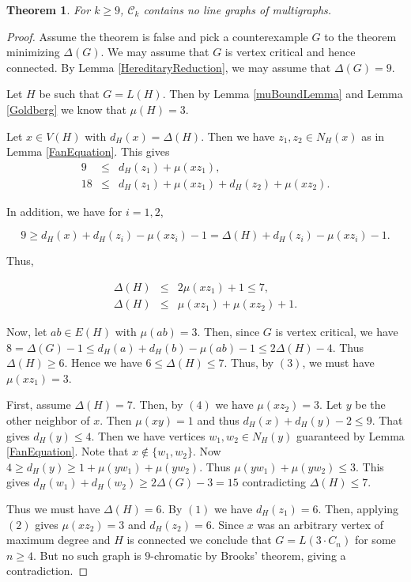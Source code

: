 \documentclass[12pt]{article}
\theoremstyle{plain}
\newtheorem{thm}{Theorem}[section]
\theoremstyle{definition}
\theoremstyle{remark}
\newcommand{\fancy}[1]{\mathcal{#1}}
\newcommand{\C}[1]{\fancy{C}_{#1}}
\begin{document}
\begin{thm}
For $k \geq 9$, $\C{k}$ contains no line graphs of multigraphs.
\end{thm}
\begin{proof}
Assume the theorem is false and pick a counterexample $G$ to the theorem  minimizing $\Delta(G)$.  We may assume that $G$ is vertex critical and hence connected.  By Lemma \ref{HereditaryReduction}, we may assume that $\Delta(G) = 9$.\newline

Let $H$ be such that $G = L(H)$.  Then by Lemma \ref{muBoundLemma} and Lemma \ref{Goldberg} we know that $\mu(H) = 3$. \newline

Let $x \in V(H)$ with $d_H(x) = \Delta(H)$.  Then we have $z_1, z_2 \in N_H(x)$ as in Lemma \ref{FanEquation}.  This gives
\begin{eqnarray}
9 &\leq& d_H(z_1) + \mu(xz_1), \\
18 &\leq& d_H(z_1) + \mu(xz_1) + d_H(z_2) + \mu(xz_2).
\end{eqnarray}

In addition, we have for $i = 1,2$, 

\[9 \geq d_H(x) + d_H(z_i) - \mu(xz_i) - 1 = \Delta(H) + d_H(z_i) - \mu(xz_i) - 1.\]

Thus,

\begin{eqnarray}
\Delta(H) &\leq& 2\mu(xz_1) + 1 \leq 7, \\
\Delta(H) &\leq& \mu(xz_1) + \mu(xz_2) + 1.
\end{eqnarray}

Now, let $ab \in E(H)$ with $\mu(ab) = 3$.  Then, since $G$ is vertex critical, we have $8 = \Delta(G) - 1 \leq d_H(a) + d_H(b) - \mu(ab) - 1 \leq 2\Delta(H) - 4$.  Thus $\Delta(H) \geq 6$.  Hence we have $6 \leq \Delta(H) \leq 7$.  Thus, by $(3)$, we must have $\mu(xz_1) = 3$.\newline

First, assume $\Delta(H) = 7$.  Then, by $(4)$ we have $\mu(xz_2) = 3$.  Let $y$ be the other neighbor of $x$.  Then $\mu(xy) = 1$ and thus $d_H(x) + d_H(y) - 2 \leq 9$.  That gives $d_H(y) \leq 4$.  Then we have vertices $w_1, w_2 \in N_H(y)$ guaranteed by Lemma \ref{FanEquation}. Note that $x \not \in \{w_1, w_2\}$.  Now $4 \geq d_H(y) \geq 1 + \mu(yw_1) + \mu(yw_2)$.  Thus $\mu(yw_1) + \mu(yw_2) \leq 3$.  This gives $d_H(w_1) + d_H(w_2) \geq 2\Delta(G) - 3 = 15$ contradicting $\Delta(H) \leq 7$.\newline

Thus we must have $\Delta(H) = 6$.  By $(1)$ we have $d_H(z_1) = 6$.  Then, applying $(2)$ gives $\mu(xz_2) = 3$ and $d_H(z_2) = 6$.  Since $x$ was an arbitrary vertex of maximum degree and $H$ is connected we conclude that $G = L(3\cdot C_n)$ for some $n \geq 4$.  But no such graph is $9$-chromatic by Brooks' theorem, giving a contradiction.
\end{proof}
\end{document}
